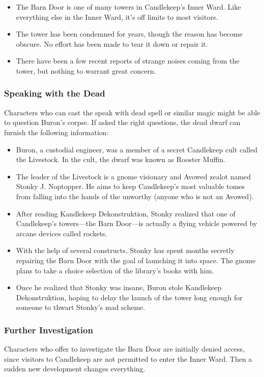 \documentclass[10pt,a4paper,twoside,bg=print,twocolumn,openany,nodeprecatedcode]{dndbook}
\begin{document}
\begin{itemize}
\item The Barn Door is one of many towers in Candlekeep's Inner Ward. Like everything else in the Inner Ward, it's off limits to most visitors.
\item The tower has been condemned for years, though the reason has become obscure. No effort has been made to tear it down or repair it.
\item There have been a few recent reports of strange noises coming from the tower, but nothing to warrant great concern.
\end{itemize}

\subsubsection{Speaking with the Dead}
Characters who can cast the speak with dead spell or similar magic might be able to question Buron's corpse. If asked the right questions, the dead dwarf can furnish the following information:


\begin{itemize}
\item Buron, a custodial engineer, was a member of a secret Candlekeep cult called the Livestock. In the cult, the dwarf was known as Rooster Muffin.
\item The leader of the Livestock is a gnome visionary and Avowed zealot named Stonky J. Noptopper. He aims to keep Candlekeep's most valuable tomes from falling into the hands of the unworthy (anyone who is not an Avowed).
\item After reading Kandlekeep Dekonstruktion, Stonky realized that one of Candlekeep's towers—the Barn Door—is actually a flying vehicle powered by arcane devices called rockets.
\item With the help of several constructs, Stonky has spent months secretly repairing the Barn Door with the goal of launching it into space. The gnome plans to take a choice selection of the library's books with him.
\item Once he realized that Stonky was insane, Buron stole Kandlekeep Dekonstruktion, hoping to delay the launch of the tower long enough for someone to thwart Stonky's mad scheme.
\end{itemize}

\subsubsection{Further Investigation}
Characters who offer to investigate the Barn Door are initially denied access, since visitors to Candlekeep are not permitted to enter the Inner Ward. Then a sudden new development changes everything.
\end{document}
